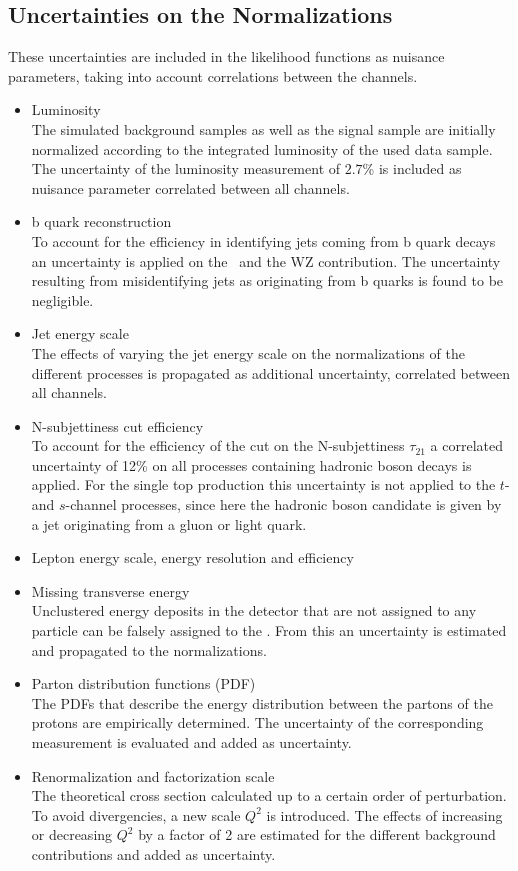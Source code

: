\subsection*{Uncertainties on the Normalizations}
These uncertainties are included in the likelihood functions as nuisance parameters, taking into account correlations between the channels.
\begin{itemize}
\item Luminosity\\
The simulated background samples as well as the signal sample are initially normalized according to the integrated luminosity of the used data sample. The uncertainty of the luminosity measurement of $2.7$\% is included as nuisance parameter correlated between all channels.
\item b quark reconstruction\\
To account for the efficiency in identifying jets coming from b quark decays \cite{CSV2} an uncertainty is applied on the \ttbar \ and the WZ contribution. The uncertainty resulting from misidentifying jets as originating from b quarks is found to be negligible.
\item Jet energy scale\\
The effects of varying the jet energy scale on the normalizations of the different processes is propagated as additional uncertainty, correlated between all channels.
\item N-subjettiness cut efficiency\\
To account for the efficiency of the cut on the N-subjettiness $\tau_{21}$ a correlated uncertainty of 12\% on all processes containing hadronic boson decays is applied. For the single top production this uncertainty is not applied to the $t$- and $s$-channel processes, since here the hadronic boson candidate is given by a jet originating from a gluon or light quark.
\item Lepton energy scale, energy resolution and efficiency\\

\item Missing transverse energy\\
Unclustered energy deposits in the detector that are not assigned to any particle can be falsely assigned to the \MET . From this an uncertainty is estimated and propagated to the normalizations. 
\item Parton distribution functions (PDF)\\
The PDFs that describe the energy distribution between the partons of the protons are empirically determined. The uncertainty of the corresponding measurement is evaluated and added as uncertainty.
\item Renormalization and factorization scale\\
The theoretical cross section calculated up to a certain order of perturbation. To avoid divergencies, a new scale $Q^2$ is introduced. The effects of increasing or decreasing $Q^2$ by a factor of 2 are estimated for the different background contributions and added as uncertainty.  
\end{itemize}
